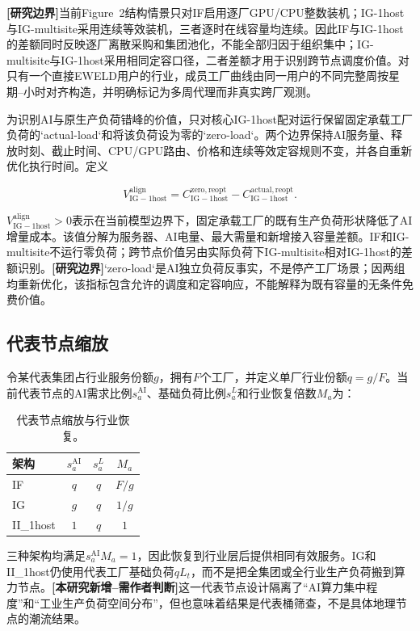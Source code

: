 \documentclass[preprint]{elsarticle}
\newcommand{\newwork}{\textcolor{orange!80!black}{\textbf{[本研究新增--需作者判断]}}}
\newcommand{\boundary}{\textcolor{black!65}{\textbf{[研究边界]}}}
\begin{document}
\boundary 当前Figure~2结构情景只对IF启用逐厂GPU/CPU整数装机；IG-1host与IG-multisite采用连续等效装机，三者逐时在线容量均连续。因此IF与IG-1host的差额同时反映逐厂离散采购和集团池化，不能全部归因于组织集中；IG-multisite与IG-1host采用相同定容口径，二者差额才用于识别跨节点调度价值。对只有一个直接EWELD用户的行业，成员工厂曲线由同一用户的不同完整周按星期--小时对齐构造，并明确标记为多周代理而非真实跨厂观测。

为识别AI与原生产负荷错峰的价值，只对核心IG-1host配对运行保留固定承载工厂负荷的`actual-load`和将该负荷设为零的`zero-load`。两个边界保持AI服务量、释放时刻、截止时间、CPU/GPU路由、价格和连续等效定容规则不变，并各自重新优化执行时间。定义

\begin{equation}
 V^{\mathrm{align}}_{\mathrm{IG-1host}}=C_{\mathrm{IG-1host}}^{\mathrm{zero,reopt}}-C_{\mathrm{IG-1host}}^{\mathrm{actual,reopt}}.
\end{equation}

$V^{\mathrm{align}}_{\mathrm{IG-1host}}>0$表示在当前模型边界下，固定承载工厂的既有生产负荷形状降低了AI增量成本。该值分解为服务器、AI电量、最大需量和新增接入容量差额。IF和IG-multisite不运行零负荷；跨节点价值另由实际负荷下IG-multisite相对IG-1host的差额识别。\boundary `zero-load`是AI独立负荷反事实，不是停产工厂场景；因两组均重新优化，该指标包含允许的调度和定容响应，不能解释为既有容量的无条件免费价值。

\subsection{代表节点缩放}

令某代表集团占行业服务份额$g$，拥有$F$个工厂，并定义单厂行业份额$q=g/F$。当前代表节点的AI需求比例$s^{\mathrm{AI}}_a$、基础负荷比例$s^{L}_a$和行业恢复倍数$M_a$为：

\begin{table}[htbp]
 \centering
 \caption{代表节点缩放与行业恢复。}
 \label{tab:representative-scaling}
 \begin{tabular}{lccc}
  \toprule
  架构 & $s^{\mathrm{AI}}_a$ & $s^L_a$ & $M_a$ \\
  \midrule
  IF & $q$ & $q$ & $F/g$ \\
  IG & $g$ & $q$ & $1/g$ \\
  II\_1host & $1$ & $q$ & $1$ \\
  \bottomrule
 \end{tabular}
\end{table}

三种架构均满足$s^{\mathrm{AI}}_aM_a=1$，因此恢复到行业层后提供相同有效服务。IG和II\_1host仍使用代表工厂基础负荷$qL_t$，而不是把全集团或全行业生产负荷搬到算力节点。\newwork 这一代表节点设计隔离了“AI算力集中程度”和“工业生产负荷空间分布”，但也意味着结果是代表桶筛查，不是具体地理节点的潮流结果。
\end{document}
